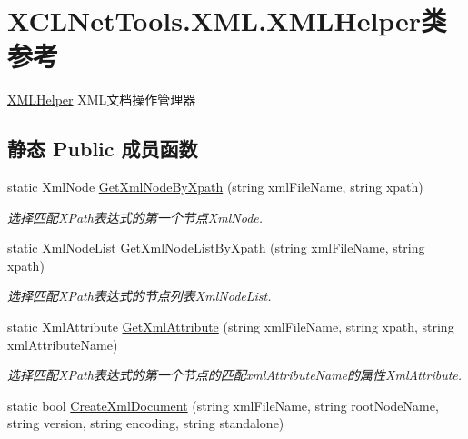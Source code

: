 \hypertarget{class_x_c_l_net_tools_1_1_x_m_l_1_1_x_m_l_helper}{\section{X\-C\-L\-Net\-Tools.\-X\-M\-L.\-X\-M\-L\-Helper类 参考}
\label{class_x_c_l_net_tools_1_1_x_m_l_1_1_x_m_l_helper}
}


\hyperlink{class_x_c_l_net_tools_1_1_x_m_l_1_1_x_m_l_helper}{X\-M\-L\-Helper} X\-M\-L文档操作管理器  


\subsection*{静态 Public 成员函数}
\begin{DoxyCompactItemize}
\item 
static Xml\-Node \hyperlink{class_x_c_l_net_tools_1_1_x_m_l_1_1_x_m_l_helper_a447b682ec92126215a8fec2000176619}{Get\-Xml\-Node\-By\-Xpath} (string xml\-File\-Name, string xpath)
\begin{DoxyCompactList}\small\item\em 选择匹配\-X\-Path表达式的第一个节点\-Xml\-Node. \end{DoxyCompactList}\item 
static Xml\-Node\-List \hyperlink{class_x_c_l_net_tools_1_1_x_m_l_1_1_x_m_l_helper_a76ff3ba97f764e08467ac33ab90eac14}{Get\-Xml\-Node\-List\-By\-Xpath} (string xml\-File\-Name, string xpath)
\begin{DoxyCompactList}\small\item\em 选择匹配\-X\-Path表达式的节点列表\-Xml\-Node\-List. \end{DoxyCompactList}\item 
static Xml\-Attribute \hyperlink{class_x_c_l_net_tools_1_1_x_m_l_1_1_x_m_l_helper_a9f5d7dcc9d2340c49cc819cbea3c5001}{Get\-Xml\-Attribute} (string xml\-File\-Name, string xpath, string xml\-Attribute\-Name)
\begin{DoxyCompactList}\small\item\em 选择匹配\-X\-Path表达式的第一个节点的匹配xml\-Attribute\-Name的属性\-Xml\-Attribute. \end{DoxyCompactList}\item 
static bool \hyperlink{class_x_c_l_net_tools_1_1_x_m_l_1_1_x_m_l_helper_a41eb1023cd0930834f907aaa7ec3e6c1}{Create\-Xml\-Document} (string xml\-File\-Name, string root\-Node\-Name, string version, string encoding, string standalone)

\end{DoxyCompactItemize}
